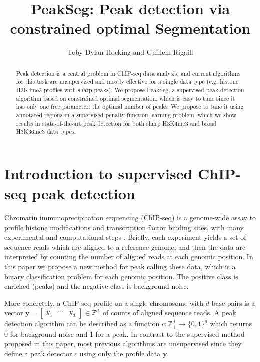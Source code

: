 \documentclass{article}
\newcommand{\ZZ}{\mathbb Z}
\begin{document}
\title{PeakSeg: \textbf{Peak} detection via constrained optimal
  \textbf{Seg}mentation}

\author{Toby Dylan Hocking and
  Guillem Rigaill}

\maketitle

\begin{abstract}
  Peak detection is a central problem in ChIP-seq data analysis, and
  current algorithms for this task are unsupervised and mostly
  effective for a single data type (e.g. histone H3K4me3 profiles with
  sharp peaks). We propose PeakSeg, a supervised peak detection
  algorithm based on constrained optimal segmentation, which is easy
  to tune since it has only one free parameter: the optimal number of
  peaks. We propose to tune it using annotated regions in a supervised
  penalty function learning problem, which we show results in
  state-of-the-art peak detection for both sharp H3K4me3 and broad
  H3K36me3 data types.
\end{abstract}

\section{Introduction to supervised ChIP-seq peak detection}

Chromatin immunoprecipitation sequencing (ChIP-seq) is a genome-wide
assay to profile histone modifications and transcription factor
binding sites, with many experimental and computational steps
\citep{practical}. Briefly, each experiment yields a set of sequence
reads which are aligned to a reference genome, and then the data are
interpreted by counting the number of aligned reads at each genomic
position. In this paper we propose a new method for peak calling these
data, which is a binary classification problem for each genomic
position. The positive class is enriched (peaks) and the negative
class is background noise.

More concretely, a ChIP-seq profile on a single
chromosome with $d$ base pairs is a vector $\mathbf y=
\left[
  \begin{array}{ccc}
    y_1 & \cdots & y_d
  \end{array}
\right]\in\ZZ_+^d$ of counts of aligned sequence reads. A peak
detection algorithm can be described as a function $c:\ZZ_+^d
\rightarrow \{0, 1\}^d$ which returns 0 for background noise and 1 for
a peak. In contrast to the supervised method proposed in this paper,
most previous algorithms are unsupervised since they define a peak
detector $c$ using only the profile data $\mathbf y$.
\end{document}
